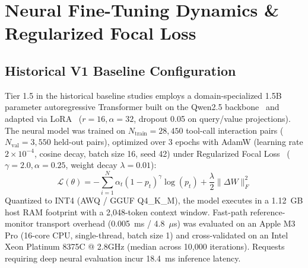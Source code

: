 \documentclass[10pt,journal,compsoc]{IEEEtran}
\begin{document}
\clearpage
\section{Neural Fine-Tuning Dynamics \& Regularized Focal Loss}

\noindent{}
\vspace{0.5em}

\subsection{Historical V1 Baseline Configuration}
Tier 1.5 in the historical baseline studies employs a domain-specialized 1.5B parameter autoregressive Transformer built on the Qwen2.5 backbone~\cite{ref_12} and adapted via LoRA~\cite{ref_13} ($r=16, \alpha=32$, dropout 0.05 on query/value projections). The neural model was trained on $N_{\text{train}} = 28,450$ tool-call interaction pairs ($N_{\text{val}} = 3,550$ held-out pairs), optimized over 3 epochs with AdamW (learning rate $2 \times 10^{-4}$, cosine decay, batch size 16, seed 42) under Regularized Focal Loss~\cite{ref_31} ($\gamma=2.0, \alpha=0.25$, weight decay $\lambda=0.01$):
\begin{equation}
\mathcal{L}(\theta) = -\sum_{i=1}^N \alpha_t (1 - p_t)^\gamma \log(p_t) + \frac{\lambda}{2} \|\Delta W\|_F^2
\end{equation}
Quantized to INT4 (AWQ / GGUF Q4\_K\_M), the model executes in a 1.12~GB host RAM footprint with a 2,048-token context window. Fast-path reference-monitor transport overhead (0.005~ms / 4.8~$\mu$s) was evaluated on an Apple M3 Pro (16-core CPU, single-thread, batch size 1) and cross-validated on an Intel Xeon Platinum 8375C @ 2.8GHz (median across 10,000 iterations). Requests requiring deep neural evaluation incur 18.4~ms inference latency.
\end{document}
